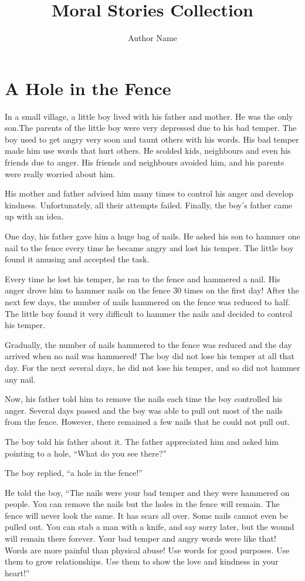 \documentclass[oneside,12pt]{article}
\title{Moral Stories Collection}
\author{Author Name}
\begin{document}
	\maketitle
\tableofcontents

\section{A Hole in the Fence}
In a small village, a little boy lived with his father and mother. He was the only son.The parents of the little boy were very depressed due to his bad temper. The boy used to get angry very soon and taunt others with his words. His bad temper made him use words that hurt others. He scolded kids, neighbours and even his friends due to anger. His friends and neighbours avoided him, and his parents were really worried about him.

His mother and father advised him many times to control his anger and develop kindness. Unfortunately, all their attempts failed. Finally, the boy’s father came up with an idea.

One day, his father gave him a huge bag of nails. He asked his son to hammer one nail to the fence every time he became angry and lost his temper. The little boy found it amusing and accepted the task.

Every time he lost his temper, he ran to the fence and hammered a nail. His anger drove him to hammer nails on the fence 30 times on the first day! After the next few days, the number of nails hammered on the fence was reduced to half. The little boy found it very difficult to hammer the nails and decided to control his temper.

Gradually, the number of nails hammered to the fence was reduced and the day arrived when no nail was hammered! The boy did not lose his temper at all that day. For the next several days, he did not lose his temper, and so did not hammer any nail.

Now, his father told him to remove the nails each time the boy controlled his anger. Several days passed and the boy was able to pull out most of the nails from the fence. However, there remained a few nails that he could not pull out.

The boy told his father about it. The father appreciated him and asked him pointing to a hole, “What do you see there?”

The boy replied, “a hole in the fence!”

He told the boy, “The nails were your bad temper and they were hammered on people. You can remove the nails but the holes in the fence will remain. The fence will never look the same. It has scars all over. Some nails cannot even be pulled out. You can stab a man with a knife, and say sorry later, but the wound will remain there forever. Your bad temper and angry words were like that! Words are more painful than physical abuse! Use words for good purposes. Use them to grow relationships. Use them to show the love and kindness in your heart!”
\end{document}
